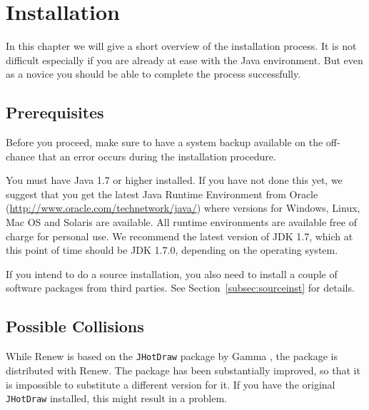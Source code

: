 \chapter{Installation}
\label{ch:install}

In this chapter we will give a short overview of the installation
process. It is not difficult especially if you are already at
ease with the Java environment. But even as a novice you should
be able to complete the process successfully.


\section{Prerequisites}\label{sec:prereq}

Before you proceed, make sure to have a system backup available
on the off-chance that an error occurs during the installation 
procedure.

You must have Java 1.7 or higher installed.
If you have not done this yet, we
suggest that you get the latest Java Runtime Environment from 
Oracle (\url{http://www.oracle.com/technetwork/java/})
where versions for Windows, Linux, Mac OS and Solaris are available. 
All runtime environments are available free of charge for
personal use.
We recommend the latest version of JDK 1.7, which at this point of time 
should be JDK 1.7.0, depending on the operating system.

If you intend to do a source installation, you also need 
to install a couple of software packages from third parties.
See Section~\ref{subsec:sourceinst} for details.


\section{Possible Collisions}

While Renew is based on the 
\texttt{JHotDraw} package by Gamma \cite{Gamma98},
the package is distributed 
with Renew. 
The package has been
substantially improved, so that it is impossible to substitute
a different version for it. If you have the original \texttt{JHotDraw}
installed, this might result in a problem.


